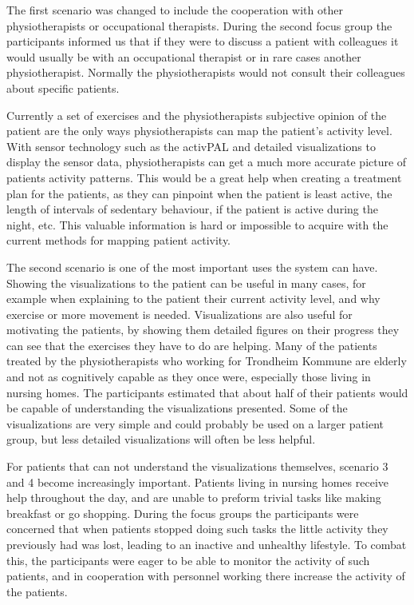 The first scenario was changed to include the cooperation with other physiotherapists or occupational therapists. During the second focus group the participants informed us that if they were to discuss a patient with colleagues it would usually be with an occupational therapist or in rare cases another physiotherapist. Normally the physiotherapists would not consult their colleagues about specific patients. 

Currently a set of exercises and the physiotherapists subjective opinion of the patient are the only ways physiotherapists can map the patient's activity level. With sensor technology such as the activPAL and detailed visualizations to display the sensor data, physiotherapists can get a much more accurate picture of patients activity patterns. This would be a great help when creating a treatment plan for the patients, as they can pinpoint when the patient is least active, the length of intervals of sedentary behaviour, if the patient is active during the night, etc. This valuable information is hard or impossible to acquire with the current methods for mapping patient activity.

The second scenario is one of the most important uses the system can have. Showing the visualizations to the patient can be useful in many cases, for example when explaining to the patient their current activity level, and why exercise or more movement is needed. Visualizations are also useful for motivating the patients, by showing them detailed figures on their progress they can see that the exercises they have to do are helping. Many of the patients treated by the physiotherapists who working for Trondheim Kommune are elderly and not as cognitively capable as they once were, especially those living in nursing homes. The participants estimated that about half of their patients would be capable of understanding the visualizations presented. Some of the visualizations are very simple and could probably be used on a larger patient group, but less detailed visualizations will often be less helpful. 

For patients that can not understand the visualizations themselves, scenario 3 and 4 become increasingly important. Patients living in nursing homes receive help throughout the day, and are unable to preform trivial tasks like making breakfast or go shopping. During the focus groups the participants were concerned that when patients stopped doing such tasks the little activity they previously had was lost, leading to an inactive and unhealthy lifestyle. To combat this, the participants were eager to be able to monitor the activity of such patients, and in cooperation with personnel working there increase the activity of the patients. 

